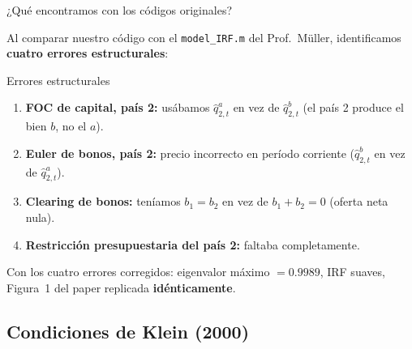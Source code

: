 
\begin{frame}{¿Qué encontramos con los códigos originales?}

  Al comparar nuestro código con el \texttt{model\_IRF.m} del Prof.\ Müller, identificamos
  \textbf{cuatro errores estructurales}:

  \bigskip
  \begin{redbox}{Errores estructurales}
    \begin{enumerate}
      \item \textbf{FOC de capital, país 2:} usábamos $\hat{q}^a_{2,t}$ en vez de
            $\hat{q}^b_{2,t}$ (el país 2 produce el bien $b$, no el $a$).
      \item \textbf{Euler de bonos, país 2:} precio incorrecto en período corriente
            ($\hat{q}^b_{2,t}$ en vez de $\hat{q}^a_{2,t}$).
      \item \textbf{Clearing de bonos:} teníamos $b_1 = b_2$ en vez de $b_1 + b_2 = 0$
            (oferta neta nula).
      \item \textbf{Restricción presupuestaria del país 2:} faltaba completamente.
    \end{enumerate}
  \end{redbox}

  \bigskip
  \small Con los cuatro errores corregidos: eigenvalor máximo $= 0.9989$, IRF suaves,
  Figura~1 del paper replicada \textbf{idénticamente}. \happy

\end{frame}

\subsection{Condiciones de Klein (2000)}


